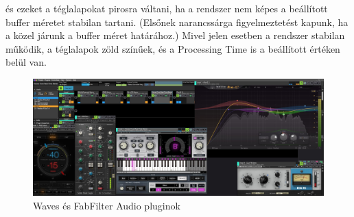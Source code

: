 és ezeket a téglalapokat pirosra váltani, ha a rendszer nem képes a beállított buffer méretet stabilan tartani.
(Elsőnek narancssárga figyelmeztetést kapunk, ha a közel járunk a buffer méret határához.)
Mivel jelen esetben a rendszer stabilan működik, a téglalapok zöld színűek, és a Processing Time is a beállított értéken belül van.
\begin{figure}[H]
	\centering
	\includegraphics[width=\textwidth, keepaspectratio]{figures/waves_plugins.jpg}
	\caption{Waves és FabFilter Audio pluginok}\label{fig:waves_plugins}
\end{figure}
